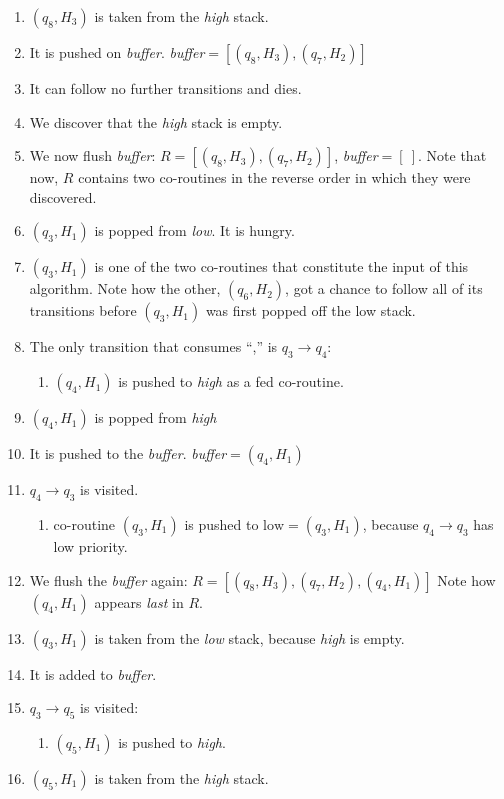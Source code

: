 \documentclass[11pt]{Thesis}
\theoremstyle{definition}
\begin{document}
\begin{example}
\begin{enumerate}
\begin{enumerate}
  \end{enumerate}
\item $(q_8, H_3)$ is taken from the \emph{high} stack.
\item It is pushed on \emph{buffer}. \emph{buffer}$=[(q_8, H_3), (q_7, H_2)]$
\item It can follow no further transitions and dies.
\item We discover that the \emph{high} stack is empty.
\item We now flush \emph{buffer}:
  $R=[(q_8, H_3), (q_7, H_2)]$, \emph{buffer}$=[\ ]$.  Note that now, $R$
  contains two co-routines in the reverse order in which they were discovered.
\item $(q_3, H_1)$ is popped from \emph{low}. It is hungry.
\item  $(q_3, H_1)$ is one of the two co-routines that constitute the
	input of this algorithm. Note how the other, $(q_6, H_2)$, got a
	chance to follow all of its transitions before $(q_3, H_1)$ was
	first popped off the low stack.
\item The only transition that consumes ``,'' is $q_3\rightarrow q_4$:\begin{enumerate}
	\item $(q_4, H_1)$ is pushed to \emph{high} as a fed co-routine.
\end{enumerate}
\item $(q_4, H_1)$ is popped from \emph{high}
\item It is pushed to the \emph{buffer}. \emph{buffer}$=(q_4, H_1)$
\item $q_4\rightarrow q_3$ is visited.
\begin{enumerate}
	\item co-routine $(q_3, H_1)$ is pushed to 
	$ \mbox{low} = (q_3, H_1)$, 
	because $q_4\rightarrow q_3$ has low priority.
\end{enumerate}
\item We flush the \emph{buffer} again: $R=[(q_8, H_3), (q_7, H_2), (q_4, H_1)]$
	Note how $(q_4, H_1)$ appears \emph{last} in $R$.
\item $(q_3, H_1)$ is taken from the \emph{low} stack, because \emph{high} is
  empty.
\item It is added to \emph{buffer}.
\item $q_3\rightarrow q_5$ is visited:\begin{enumerate}
	\item $(q_5, H_1)$ is pushed to \emph{high}.
\end{enumerate}
\item $(q_5, H_1)$ is taken from the \emph{high} stack.

\end{enumerate}
\end{example}
\end{document}
